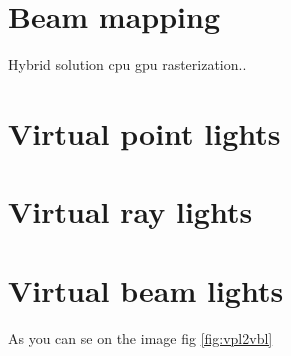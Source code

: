\section{Beam mapping}
\cite{jarosz11progressive}
Hybrid solution cpu gpu rasterization..
\section{Virtual point lights}
\cite{Keller97instantradiosity} %
\cite{HasanVSL} %
\section{Virtual ray lights}
\cite{novak12vrls}
\section{Virtual beam lights}
As you can se on the image fig \ref{fig:vpl2vbl}
\cite{novak12vbls}




